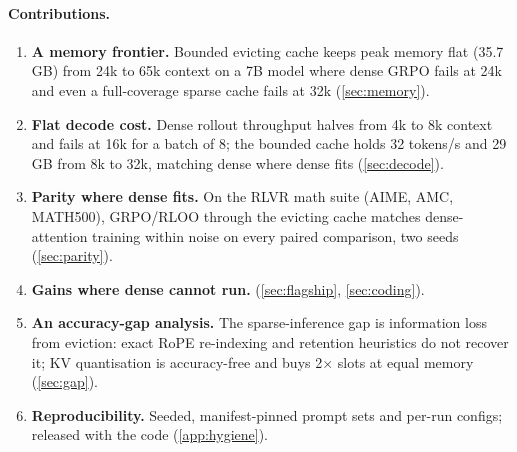 \paragraph{Contributions.}
\begin{enumerate}
  \item \textbf{A memory frontier.} Bounded evicting cache keeps peak memory
    flat (35.7\,GB) from 24k to 65k context on a 7B model where dense GRPO
    fails at 24k and even a full-coverage sparse cache fails at 32k
    (\cref{sec:memory}).
  \item \textbf{Flat decode cost.} Dense rollout throughput halves from 4k
    to 8k context and fails at 16k for a batch of 8; the bounded cache
    holds 32 tokens/s and 29\,GB from 8k to 32k, matching dense where dense
    fits (\cref{sec:decode}).
  \item \textbf{Parity where dense fits.} On the RLVR math suite (AIME,
    AMC, MATH500), GRPO/RLOO through the evicting cache matches
    dense-attention training within noise on every paired comparison, two
    seeds (\cref{sec:parity}).
  \item \textbf{Gains where dense cannot run.} 
    (\cref{sec:flagship}, \cref{sec:coding}).
  \item \textbf{An accuracy-gap analysis.} The sparse-inference gap is
    information loss from eviction: exact RoPE re-indexing and retention
    heuristics do not recover it; KV quantisation is accuracy-free and buys
    2$\times$ slots at equal memory (\cref{sec:gap}).
  \item \textbf{Reproducibility.} Seeded, manifest-pinned prompt sets and
    per-run configs; released with the code (\cref{app:hygiene}).
\end{enumerate}
